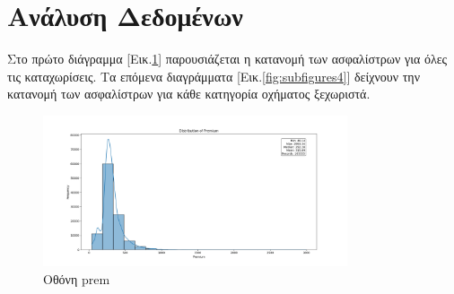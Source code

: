 \documentclass{llncs}
\begin{document}
\section{Ανάλυση Δεδομένων}
Στο πρώτο διάγραμμα [Εικ.\ref{fig:prem}] παρουσιάζεται η κατανομή των ασφαλίστρων για όλες τις καταχωρίσεις. Τα επόμενα διαγράμματα [Εικ.\ref{fig:subfigures4}] δείχνουν την κατανομή των ασφαλίστρων για κάθε κατηγορία οχήματος ξεχωριστά.
\begin{figure}
    \begin{center}
        \includegraphics[width=0.8\textwidth]{images/premium.png}
    \end{center}
    \caption{Οθόνη prem} 
    \label{fig:prem}   
\end{figure}
\end{document}
